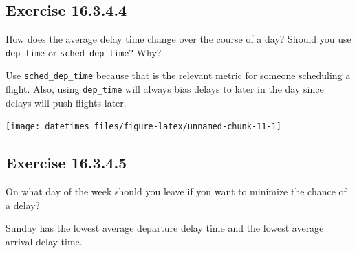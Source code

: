 \documentclass[]{book}
\newenvironment{Shaded}{\begin{snugshade}}{\end{snugshade}}
\newcommand{\CommentTok}[1]{\textcolor[rgb]{0.56,0.35,0.01}{\textit{#1}}}
\newcommand{\DataTypeTok}[1]{\textcolor[rgb]{0.13,0.29,0.53}{#1}}
\newcommand{\KeywordTok}[1]{\textcolor[rgb]{0.13,0.29,0.53}{\textbf{#1}}}
\newcommand{\NormalTok}[1]{#1}
\newcommand{\OperatorTok}[1]{\textcolor[rgb]{0.81,0.36,0.00}{\textbf{#1}}}
\newcommand{\StringTok}[1]{\textcolor[rgb]{0.31,0.60,0.02}{#1}}
\theoremstyle{plain}
\theoremstyle{remark}
\begin{document}
\hypertarget{exercise-16.3.4.4}{%
\subsection*{\texorpdfstring{Exercise {16.3.4.4}}{Exercise 16.3.4.4}}\label{exercise-16.3.4.4}}

How does the average delay time change over the course of a day? Should you use \texttt{dep\_time} or \texttt{sched\_dep\_time}? Why?

Use \texttt{sched\_dep\_time} because that is the relevant metric for someone scheduling a flight. Also, using \texttt{dep\_time} will always bias delays to later in the day since delays will push flights later.

\begin{Shaded}
\end{Shaded}

\begin{center}\texttt{[image: datetimes\_files/figure-latex/unnamed-chunk-11-1]} \end{center}

\hypertarget{exercise-16.3.4.5}{%
\subsection*{\texorpdfstring{Exercise {16.3.4.5}}{Exercise 16.3.4.5}}\label{exercise-16.3.4.5}}

On what day of the week should you leave if you want to minimize the chance of a delay?

Sunday has the lowest average departure delay time and the lowest average arrival delay time.
\end{document}
